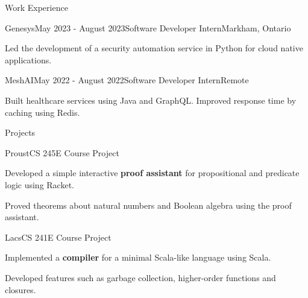 \documentclass[
	12pt, %
]{resume} %
\begin{document}
\begin{rSection}{Work Experience}

	\begin{rSubsection}{Genesys}{May 2023 - August 2023}{Software Developer Intern}{Markham, Ontario}
		\item Led the development of a security automation service in Python for cloud native applications.
	\end{rSubsection}


	\begin{rSubsection}{MeshAI}{May 2022 - August 2022}{Software Developer Intern}{Remote}
		\item Built healthcare services using Java and GraphQL. Improved response time by caching using Redis.
	\end{rSubsection}



\end{rSection}

\begin{rSection}{Projects}
     \begin{rSubsection}{Proust}{CS 245E Course Project}{}{}
        \item Developed a simple interactive \textbf{proof assistant} for propositional and predicate logic using Racket.
        \item Proved theorems about natural numbers and Boolean algebra using the proof assistant.
     \end{rSubsection}
     \begin{rSubsection}{Lacs}{CS 241E Course Project}{}{}
		\item Implemented a \textbf{compiler} for a minimal Scala-like language using Scala.
        \item Developed features such as garbage collection, higher-order functions and closures.
	\end{rSubsection}
\end{rSection}
\end{document}
